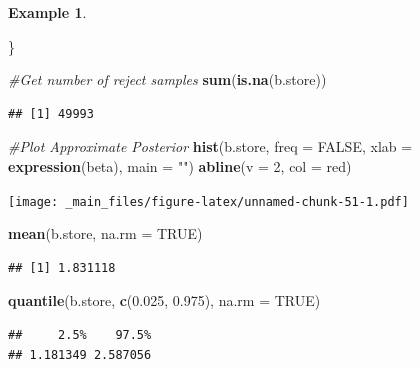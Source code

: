 \documentclass[
]{book}
\newenvironment{Shaded}{\begin{snugshade}}{\end{snugshade}}
\newcommand{\AttributeTok}[1]{\textcolor[rgb]{0.13,0.29,0.53}{#1}}
\newcommand{\CommentTok}[1]{\textcolor[rgb]{0.56,0.35,0.01}{\textit{#1}}}
\newcommand{\ConstantTok}[1]{\textcolor[rgb]{0.56,0.35,0.01}{#1}}
\newcommand{\DecValTok}[1]{\textcolor[rgb]{0.00,0.00,0.81}{#1}}
\newcommand{\FloatTok}[1]{\textcolor[rgb]{0.00,0.00,0.81}{#1}}
\newcommand{\FunctionTok}[1]{\textcolor[rgb]{0.13,0.29,0.53}{\textbf{#1}}}
\newcommand{\NormalTok}[1]{#1}
\newcommand{\StringTok}[1]{\textcolor[rgb]{0.31,0.60,0.02}{#1}}
\theoremstyle{definition}
\theoremstyle{definition}
\newtheorem{example}{Example}[chapter]
\theoremstyle{definition}
\theoremstyle{definition}
\theoremstyle{remark}
\begin{document}
\begin{example}
\begin{Shaded}
\begin{Highlighting}[]
\NormalTok{\}}

\CommentTok{\#Get number of reject samples}
\FunctionTok{sum}\NormalTok{(}\FunctionTok{is.na}\NormalTok{(b.store))}
\end{Highlighting}
\end{Shaded}

\begin{verbatim}
## [1] 49993
\end{verbatim}

\begin{Shaded}
\begin{Highlighting}[]
\CommentTok{\#Plot Approximate Posterior}
\FunctionTok{hist}\NormalTok{(b.store, }\AttributeTok{freq =} \ConstantTok{FALSE}\NormalTok{, }\AttributeTok{xlab =} \FunctionTok{expression}\NormalTok{(beta), }\AttributeTok{main =} \StringTok{""}\NormalTok{)}
\FunctionTok{abline}\NormalTok{(}\AttributeTok{v =} \DecValTok{2}\NormalTok{, }\AttributeTok{col =} \StringTok{\textquotesingle{}red\textquotesingle{}}\NormalTok{)}
\end{Highlighting}
\end{Shaded}

\texttt{[image: \_main\_files/figure-latex/unnamed-chunk-51-1.pdf]}

\begin{Shaded}
\begin{Highlighting}[]
\FunctionTok{mean}\NormalTok{(b.store, }\AttributeTok{na.rm =} \ConstantTok{TRUE}\NormalTok{)}
\end{Highlighting}
\end{Shaded}

\begin{verbatim}
## [1] 1.831118
\end{verbatim}

\begin{Shaded}
\begin{Highlighting}[]
\FunctionTok{quantile}\NormalTok{(b.store, }\FunctionTok{c}\NormalTok{(}\FloatTok{0.025}\NormalTok{, }\FloatTok{0.975}\NormalTok{), }\AttributeTok{na.rm =} \ConstantTok{TRUE}\NormalTok{)}
\end{Highlighting}
\end{Shaded}

\begin{verbatim}
##     2.5%    97.5% 
## 1.181349 2.587056
\end{verbatim}

\end{example}
\end{document}
